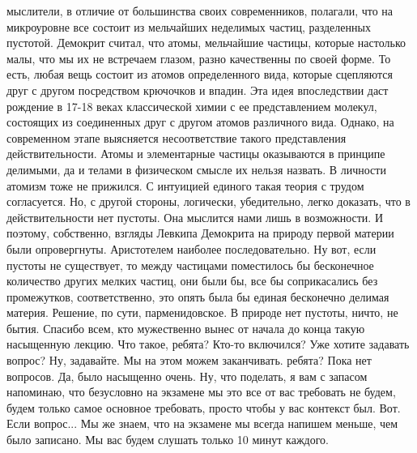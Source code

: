 мыслители, в отличие от большинства своих современников, полагали, что на
микроуровне все состоит из мельчайших неделимых частиц, разделенных пустотой.
Демокрит считал, что атомы, мельчайшие частицы, которые настолько малы, что мы
их не встречаем глазом, разно качественны по своей форме. То есть, любая вещь
состоит из атомов определенного вида, которые сцепляются друг с другом
посредством крючочков и впадин. Эта идея впоследствии даст рождение в 17-18
веках классической химии с ее представлением молекул, состоящих из соединенных
друг с другом атомов различного вида. Однако, на современном этапе выясняется
несоответствие такого представления действительности. Атомы и элементарные
частицы оказываются в принципе делимыми, да и телами в физическом смысле их
нельзя назвать. В личности атомизм тоже не прижился. С интуицией единого такая
теория с трудом согласуется. Но, с другой стороны, логически, убедительно, легко
доказать, что в действительности нет пустоты. Она мыслится нами лишь в
возможности. И поэтому, собственно, взгляды Левкипа Демокрита на природу первой
материи были опровергнуты. Аристотелем наиболее последовательно. Ну вот, если
пустоты не существует, то между частицами поместилось бы бесконечное количество
других мелких частиц, они были бы, все бы соприкасались без промежутков,
соответственно, это опять была бы единая бесконечно делимая материя. Решение, по
сути, парменидовское. В природе нет пустоты, ничто, не бытия. Спасибо всем, кто
мужественно вынес от начала до конца такую насыщенную лекцию. Что такое, ребята?
Кто-то включился? Уже хотите задавать вопрос? Ну, задавайте. Мы на этом можем
заканчивать. ребята? Пока нет вопросов. Да, было насыщенно очень. Ну, что
поделать, я вам с запасом напоминаю, что безусловно на экзамене мы это все от
вас требовать не будем, будем только самое основное требовать, просто чтобы у
вас контекст был. Вот. Если вопрос... Мы же знаем, что на экзамене мы всегда
напишем меньше, чем было записано. Мы вас будем слушать только 10 минут каждого.
